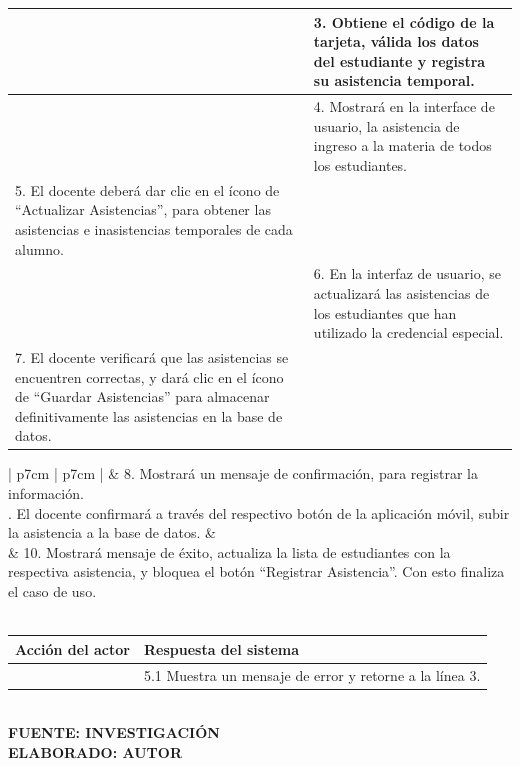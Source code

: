 \begin{table}[h!]
\begin{tabular}{| p{7cm} | p{7cm} |}
		&  3. Obtiene el código de la tarjeta, válida los datos del estudiante y registra su asistencia temporal.\\ \hline
		& 4. Mostrará en la interface de usuario, la asistencia de ingreso a la materia de todos los estudiantes.  \\ \hline
		5. El docente deberá dar clic en el ícono de “Actualizar Asistencias”, para obtener las asistencias e inasistencias temporales de cada alumno. & \\ \hline
		& 6. En la interfaz de usuario, se actualizará las asistencias de los estudiantes que han utilizado la credencial especial. \\ \hline
		7. El docente verificará que las asistencias se encuentren correctas, y dará clic en el ícono de “Guardar Asistencias” para almacenar definitivamente las asistencias en la base de datos. & \\ \hline
	\end{tabular}
\end{table}

\begin{table}[h!]
	\centering
	\begin{tabular}{| p{7cm} | p{7cm} |}
		\hline
		&  8. Mostrará un mensaje de confirmación, para registrar la información. \\ . El docente confirmará a través del respectivo botón de la aplicación móvil, subir la asistencia a la base de datos. & \\ \hline
		& 10. Mostrará mensaje de éxito, actualiza la lista de estudiantes con la respectiva asistencia, y bloquea el botón “Registrar Asistencia”. Con esto finaliza el caso de uso. \\ \hline
		 \\ \hline
	\end{tabular}
	\begin{tabular}{| p{7cm} | p{7cm} |}
		\textbf{Acción del actor} & \textbf{Respuesta del sistema} \\ \hline	
		& 5.1 Muestra un mensaje de error y retorne a la línea 3.    \\ \hline
	\end{tabular}
	\vspace{4mm}
	{\footnotesize \textbf{\\ FUENTE: INVESTIGACIÓN} \textbf{\\ ELABORADO: AUTOR}}
\end{table}


